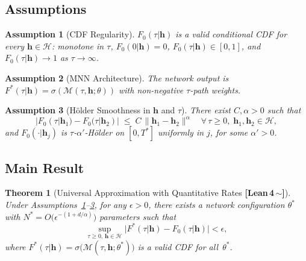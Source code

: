 \documentclass[11pt]{article}
\newtheorem{theorem}{Theorem}[section]
\newtheorem{assumption}{Assumption}[section]
\theoremstyle{remark}
\newcommand{\partverified}{%
  \textcolor{orange!80!black}{\textbf{[Lean\,4\,$\sim$]}}}
\newcommand{\cH}{\mathcal{H}}
\newcommand{\cM}{\mathcal{M}}
\newcommand{\hhat}{\boldsymbol{h}}
\newcommand{\sigmoid}{\sigma}
\begin{document}
\subsection{Assumptions}

\begin{assumption}[CDF Regularity]
\label{ass:cdf}
$F_0(\tau|\hhat)$ is a valid conditional CDF for every $\hhat \in \cH$:
monotone in $\tau$, $F_0(0|\hhat) = 0$, $F_0(\tau|\hhat) \in [0,1]$,
and $F_0(\tau|\hhat) \to 1$ as $\tau \to \infty$.
\end{assumption}

\begin{assumption}[MNN Architecture]
\label{ass:arch}
The network output is $F^*(\tau|\hhat) = \sigmoid(\cM(\tau,\hhat;\theta))$
with non-negative $\tau$-path weights.
\end{assumption}

\begin{assumption}[H\"older Smoothness in $\hhat$ and $\tau$]
\label{ass:holder}
There exist $C, \alpha > 0$ such that
\[
  |F_0(\tau|\hhat_1) - F_0(\tau|\hhat_2)|
  \;\leq\; C\,\|\hhat_1 - \hhat_2\|^\alpha
  \quad \forall\,\tau \geq 0,\;\hhat_1,\hhat_2 \in \cH,
\]
and $F_0(\cdot|\hhat_j)$ is $\tau$-$\alpha'$-H\"{o}lder on $[0,T^*]$
uniformly in $j$, for some $\alpha' > 0$.
\end{assumption}

\subsection{Main Result}

\begin{theorem}[Universal Approximation with Quantitative Rates \partverified{}]
\label{thm:ua}
Under Assumptions~\ref{ass:cdf}--\ref{ass:holder}, for any $\epsilon > 0$,
there exists a network configuration $\theta^*$ with
$N^* = O\!\bigl(\epsilon^{-(1+d/\alpha)}\bigr)$ parameters such that
\[
  \sup_{\tau \geq 0,\, \hhat \in \cH}
  \bigl|F^*(\tau|\hhat) - F_0(\tau|\hhat)\bigr| < \epsilon,
\]
where $F^*(\tau|\hhat) = \sigmoid\!\bigl(\cM(\tau,\hhat;\theta^*)\bigr)$
is a valid CDF for all~$\theta^*$.
\end{theorem}
\end{document}
